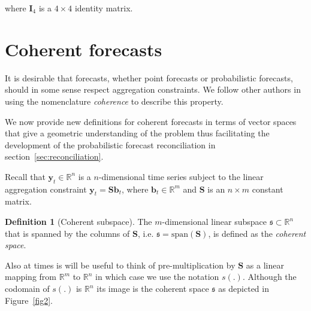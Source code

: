 \documentclass[a4paper, 11pt]{article}
\theoremstyle{theo}
\theoremstyle{definition}
\newtheorem{definition}{Definition}[section]
\begin{document}
where $\bm{I}_4$ is a $4\times 4$ identity matrix.  

\section{Coherent forecasts}\label{sec:definitions}

It is desirable that forecasts, whether point forecasts or probabilistic forecasts, should in some sense respect aggregation constraints.  We follow other authors \cite{Wickramasuriya2017} in using the nomenclature {\em coherence} to describe this property.   

We now provide new definitions for coherent forecasts in terms of vector spaces that give a geometric understanding of the problem thus facilitating the development of the probabilistic forecast reconciliation in section~\ref{sec:reconciliation}. 

Recall that $\bm{y}_t \in \mathbb{R}^n$ is a $n$-dimensional time series subject to the linear aggregation constraint $\bm{y}_t = \bm{S}\bm{b}_t$, where $\bm{b}_t \in \mathbb{R}^m$ and $\bm{S}$ is an $n \times m$ constant matrix.

\begin{definition}[Coherent subspace]\label{def:cohspace}
 The $m$-dimensional linear subspace $\mathfrak{s}\subset \mathbb{R}^n$ that is spanned by the columns of $\bm{S}$, i.e. $\mathfrak{s}=\mbox{span}(\bm{S})$, is defined as the {\em coherent space}. 
\end{definition}

Also at times is  will be useful to think of pre-multiplication by $\bm{S}$ as a linear mapping from $\mathbb{R}^m$ to $\mathbb{R}^n$ in which case we use the notation $s(.)$.  Although the codomain of $s(.)$ is $\mathbb{R}^n$ its image is the coherent space $\mathfrak{s}$ as depicted in Figure~\ref{fig2}.
\end{document}
